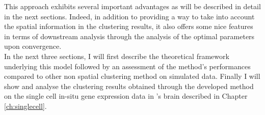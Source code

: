 This approach exhibits several important advantages as will be described in detail in the next sections. Indeed, in addition to providing a way to take into account the spatial information in the clustering results, it also offers some nice features in terms of downstream analysis through the analysis of the optimal parameters upon convergence.\\

In the next three sections, I will first describe the theoretical framework underlying this model followed by an assessment of the method's performances compared to other non spatial clustering method on simulated data. Finally I will show and analyse the clustering results obtained through the developed method on the single cell in-situ gene expression data in \platy{}'s brain described in Chapter \ref{ch:singlecell}.


